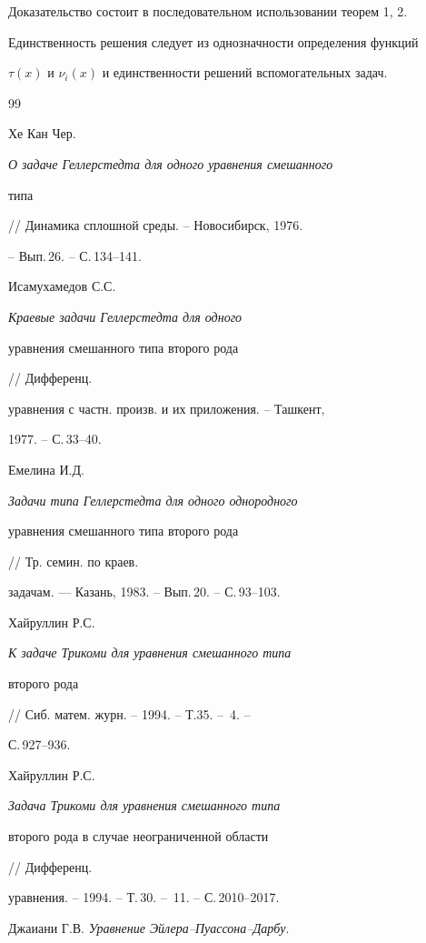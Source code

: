  


Доказательство состоит в последовательном использовании теорем 1, 2. 


Единственность решения следует из однозначности определения функций 


$\tau(x)$ и $\nu_i(x)$ и единственности решений вспомогательных задач. 


 


 


\begin{thebibliography}{99} 


 




Хе Кан Чер. {\em О задаче Геллерстедта для одного уравнения смешанного 


типа} // Динамика сплошной среды. -- Новосибирск, 1976. 


-- Вып.\,26. -- С.\,134--141. 




Исамухамедов С.С. {\em Краевые задачи Геллерстедта для одного 


уравнения смешанного типа второго рода} // Дифференц.


уравнения с частн. произв. и их приложения. -- Ташкент, 


1977. -- С.\,33--40. 




Емелина И.Д. {\em Задачи типа Геллерстедта для одного однородного 


уравнения смешанного типа второго рода} // Тр. семин. по краев. 


задачам. --- Казань, 1983. -- Вып.\,20. -- С.\,93--103. 




Хайруллин Р.С. {\em К задаче Трикоми для уравнения смешанного типа 


второго рода} // Сиб. матем. журн. -- 1994. -- Т.35. -- \No\,4. -- 


С.\,927--936. 




Хайруллин Р.С. {\em Задача Трикоми для уравнения смешанного типа 


второго рода в случае неограниченной области} // Дифференц.


уравнения. -- 1994. -- Т.\,30. -- \No\,11. -- С.\,2010--2017. 




Джаиани Г.В. {\em Уравнение Эйлера--Пуассона--Дарбу}.



\end{thebibliography}
